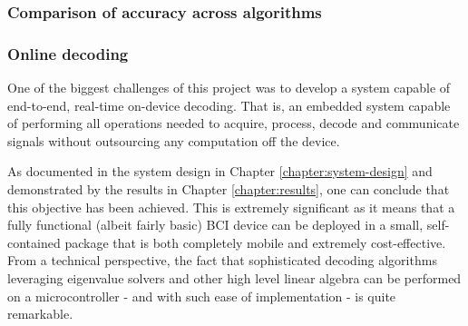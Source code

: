 \subsubsection{Comparison of accuracy across algorithms}
\label{subsection:algo-comparison-results}

\subsubsection{Online decoding}
One of the biggest challenges of this project was to develop a system capable of end-to-end, real-time on-device decoding. That is, an embedded system capable of performing all operations needed to acquire, process, decode and communicate signals without outsourcing any computation off the device. 

As documented in the system design in Chapter \ref{chapter:system-design} and demonstrated by the results in Chapter \ref{chapter:results}, one can conclude that this objective has been achieved. This is extremely significant as it means that a fully functional (albeit fairly basic) BCI device can be deployed in a small, self-contained package that is both completely mobile and extremely cost-effective. From a technical perspective, the fact that sophisticated decoding algorithms leveraging eigenvalue solvers and other high level linear algebra can be performed on a microcontroller - and with such ease of implementation - is quite remarkable.  

